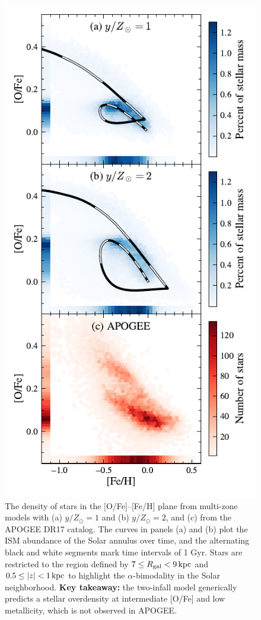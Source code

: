 \documentclass[twocolumn,twocolappendix,linenumbers]{aastex631}
\begin{document}
\begin{figure}
    \centering
    \includegraphics{figures/ofe_feh_density.pdf}
    \caption{The density of stars in the [O/Fe]--[Fe/H] plane from multi-zone models with (a) $y/Z_\odot=1$ and (b) $y/Z_\odot=2$, and (c) from the APOGEE DR17 catalog. The curves in panels (a) and (b) plot the ISM abundance of the Solar annulus over time, and the alternating black and white segments mark time intervals of {1 Gyr}. Stars are restricted to the region defined by $7\leq R_{\rm gal}< 9\,{\rm kpc}$ and $0.5\leq|z|<1\,{\rm kpc}$ to highlight the $\alpha$-bimodality in the Solar neighborhood. {\bf Key takeaway:} the two-infall model generically predicts a stellar overdensity at intermediate [O/Fe] and low metallicity, which is not observed in APOGEE.}
    \label{fig:ofe-feh-density}
\end{figure}
\end{document}
